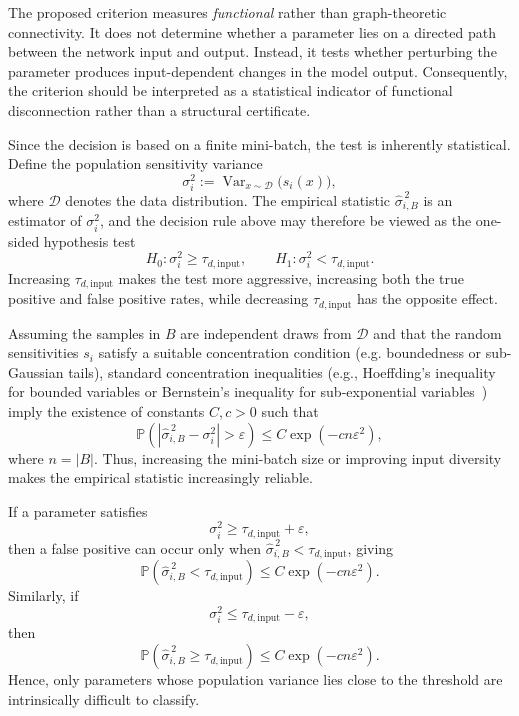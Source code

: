 \documentclass{article}
\theoremstyle{definition}
\theoremstyle{remark}
\begin{document}
The proposed criterion measures \emph{functional} rather than graph-theoretic connectivity. It does not determine whether a parameter lies on a directed path between the network input and output. Instead, it tests whether perturbing the parameter produces input-dependent changes in the model output. Consequently, the criterion should be interpreted as a statistical indicator of functional disconnection rather than a structural certificate.

Since the decision is based on a finite mini-batch, the test is inherently statistical. Define the population sensitivity variance
\[
\sigma_i^2
:=
\operatorname{Var}_{x\sim\mathcal D}
\bigl(s_i(x)\bigr),
\]
where \(\mathcal D\) denotes the data distribution. The empirical statistic
\(\widehat{\sigma}_{i,B}^{\,2}\) is an estimator of \(\sigma_i^2\), and the decision rule above may therefore be viewed as the one-sided hypothesis test
\[
H_0:\sigma_i^2\ge\tau_{d,\mathrm{input}},
\qquad
H_1:\sigma_i^2<\tau_{d,\mathrm{input}}.
\]
Increasing \(\tau_{d,\mathrm{input}}\) makes the test more aggressive, increasing both the true positive and false positive rates, while decreasing \(\tau_{d,\mathrm{input}}\) has the opposite effect.

Assuming the samples in \(B\) are independent draws from \(\mathcal D\) and that the random sensitivities $s_i$ satisfy a suitable concentration condition (e.g. boundedness or sub-Gaussian tails), standard concentration inequalities (e.g., Hoeffding's inequality for bounded
variables or Bernstein's inequality for sub-exponential
variables~\cite{boucheron2013concentration, vershynin2018hdp}) imply the existence of constants \(C,c>0\) such that
\begin{equation}
\mathbb P
\left(
\left|
\widehat{\sigma}_{i,B}^{\,2}
-
\sigma_i^2
\right|
>
\varepsilon
\right)
\le
C\exp(-cn\varepsilon^2),
\label{eq:variance_concentration}
\end{equation}
where \(n=|B|\). Thus, increasing the mini-batch size or improving input diversity makes the empirical statistic increasingly reliable.

If a parameter satisfies
\[
\sigma_i^2\ge\tau_{d,\mathrm{input}}+\varepsilon,
\]
then a false positive can occur only when
\(\widehat{\sigma}_{i,B}^{\,2}<\tau_{d,\mathrm{input}}\), giving
\[
\mathbb P
\left(
\widehat{\sigma}_{i,B}^{\,2}<\tau_{d,\mathrm{input}}
\right)
\le
C\exp(-cn\varepsilon^2).
\]
Similarly, if
\[
\sigma_i^2\le\tau_{d,\mathrm{input}}-\varepsilon,
\]
then
\[
\mathbb P
\left(
\widehat{\sigma}_{i,B}^{\,2}\ge\tau_{d,\mathrm{input}}
\right)
\le
C\exp(-cn\varepsilon^2).
\]
Hence, only parameters whose population variance lies close to the threshold are intrinsically difficult to classify.
\end{document}

